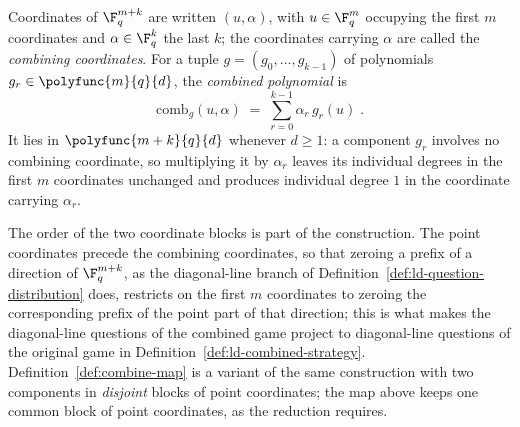 \begin{definition}
	\label{def:ld-combining-map}
	\leanok
	Coordinates of $\F_q^{m+k}$ are written $(u,\alpha)$, with $u \in \F_q^m$
	occupying the first $m$ coordinates and $\alpha \in \F_q^k$ the last $k$;
	the coordinates carrying $\alpha$ are called the \emph{combining
	coordinates}.  For a tuple $g = (g_0,\ldots,g_{k-1})$ of polynomials
	$g_r \in \polyfunc{m}{q}{d}$, the \emph{combined polynomial} is
	\[
		\mathrm{comb}_g(u,\alpha) \;=\; \sum_{r=0}^{k-1} \alpha_r\, g_r(u)\;.
	\]
	It lies in $\polyfunc{m+k}{q}{d}$ whenever $d \ge 1$: a component $g_r$
	involves no combining coordinate, so multiplying it by $\alpha_r$ leaves its
	individual degrees in the first $m$ coordinates unchanged and produces
	individual degree $1$ in the coordinate carrying $\alpha_r$.

	The order of the two coordinate blocks is part of the construction.  The
	point coordinates precede the combining coordinates, so that zeroing a
	prefix of a direction of $\F_q^{m+k}$, as the diagonal-line branch of
	Definition~\ref{def:ld-question-distribution} does, restricts on the first
	$m$ coordinates to zeroing the corresponding prefix of the point part of
	that direction; this is what makes the diagonal-line questions of the
	combined game project to diagonal-line questions of the original game in
	Definition~\ref{def:ld-combined-strategy}.  Definition~\ref{def:combine-map}
	is a variant of the same construction with two components in \emph{disjoint}
	blocks of point coordinates; the map above keeps one common block of point
	coordinates, as the reduction requires.
\end{definition}

